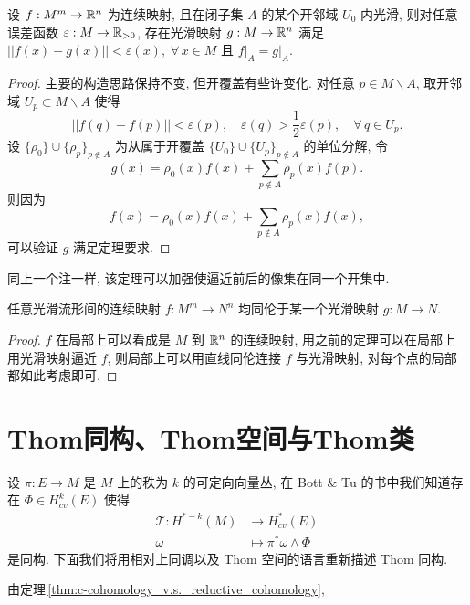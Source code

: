         \begin{theorem}[用光滑映射逼近连续映射且保持在某个闭集不动]
            设 $f:M^m\rightarrow\mathbb{R}^n$ 为连续映射, 且在闭子集 $A$ 的某个开邻域 $U_0$ 内光滑, 则对任意误差函数 $\varepsilon:M\rightarrow\mathbb{R}_{>0}$,
            存在光滑映射 $g:M\rightarrow\mathbb{R}^n$ 满足 $||f(x)-g(x)||<\varepsilon(x),\;\forall\,x\in M$ 且 $f\big|_A = g\big|_A$.
        \end{theorem}
        \begin{proof}
            主要的构造思路保持不变, 但开覆盖有些许变化. 对任意 $p\in M\backslash A$, 取开邻域 $U_p\subset M\backslash A$ 使得 
            \begin{equation*}
                ||f(q)-f(p)||<\varepsilon(p),\quad\varepsilon(q)>\frac{1}{2}\varepsilon(p),\quad\forall\,q\in U_p.
            \end{equation*}
            设 $\{\rho_0\}\cup\{\rho_p\}_{p\notin A}$ 为从属于开覆盖 $\{U_0\}\cup\{U_p\}_{p\notin A}$ 的单位分解, 令
            \begin{equation*}
                g(x) = \rho_0(x)f(x) + \sum_{p\notin A}\rho_p(x)f(p).
            \end{equation*}
            则因为
            \begin{equation*}
                f(x) = \rho_0(x)f(x) + \sum_{p\notin A}\rho_p(x)f(x), 
            \end{equation*}
            可以验证 $g$ 满足定理要求.
        \end{proof}
        \begin{remark}
            同上一个注一样, 该定理可以加强使逼近前后的像集在同一个开集中.
        \end{remark}
        \begin{theorem}[任意连续映射都同伦于一个光滑映射]
            任意光滑流形间的连续映射 $f:M^m\rightarrow N^n$ 均同伦于某一个光滑映射 $g:M\rightarrow N$.
        \end{theorem}
        \begin{proof}
            $f$ 在局部上可以看成是 $M$ 到 $\mathbb{R}^n$ 的连续映射, 用之前的定理可以在局部上用光滑映射逼近 $f$, 则局部上可以用直线同伦连接 $f$ 与光滑映射, 对每个点的局部都如此考虑即可.

            
        \end{proof}

    \section{Thom同构、Thom空间与Thom类}
        设 $\pi:E\rightarrow M$ 是 $M$ 上的秩为 $k$ 的可定向向量丛, 在 {\rm Bott \& Tu } 的书中我们知道存在 $\Phi\in H^k_{cv}(E)$ 使得 
        \begin{align*}
            \mathcal{T}:H^{*-k}(M)&\rightarrow H^*_{cv}(E) \\
            \omega&\mapsto\pi^*\omega\wedge\Phi
        \end{align*}
        是同构. 下面我们将用相对上同调以及 Thom 空间的语言重新描述 Thom 同构. 

        由定理\,\ref{thm:c-cohomology_v.s._reductive_cohomology}, 